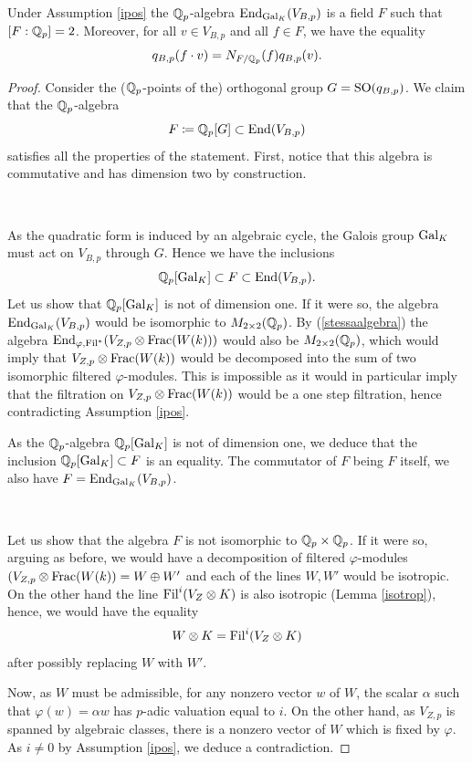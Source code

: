 \documentclass[11pt]{amsart}
\begin{document}
\begin{prop}\label{propendo}
Under  Assumption \ref{ipos} the
$\mathbb{Q}_p$-algebra  $\textnormal{End}_{\textnormal{Gal}_K}(V_{B,p})$
is a field $F$ such that  $[F:\mathbb{Q}_p]=2$. Moreover, for all $v\in V_{B,p}$ and all $f\in F$,  we have the equality
\begin{equation} \label{eq:nonso}
 q_{B,p}(f \cdot v)=N_{F/\mathbb{Q}_p}(f) q_{B,p}(v).
\end{equation}
\end{prop}
\begin{proof}
Consider the ($\mathbb{Q}_p$-points of the) orthogonal  group $G=\textnormal{SO}(q_{B,p})$. We claim that the $\mathbb{Q}_p$-algebra
\[F\coloneqq \mathbb{Q}_p[G]\subset \textnormal{End} (V_{B,p})\]
satisfies all the properties of the statement. First, notice that this algebra is commutative and has dimension two by construction.  

\

As the quadratic form is induced by an algebraic cycle, the Galois group $\textnormal{Gal}_K$ must act on $V_{B,p}$ through $G$. Hence we have the inclusions  
\[\mathbb{Q}_p[\textnormal{Gal}_K]\subset  F \subset  \textnormal{End} (V_{B,p}).\] 
Let us show that $\mathbb{Q}_p[\textnormal{Gal}_K]$ is not of dimension one. If it were so, the algebra $\textnormal{End}_{\textnormal{Gal}_K}(V_{B,p})$ would be isomorphic to $M_{2\times 2}(\mathbb{Q}_p)$. By   (\ref{stessaalgebra}) the algebra $\textnormal{End}_{\varphi,\textnormal{Fil}^*}(V_{Z,p}\otimes \mathrm{Frac}(W(k)))$ would also be $M_{2\times 2}(\mathbb{Q}_p)$, which would imply that $V_{Z,p}\otimes \mathrm{Frac}(W(k))$ would be decomposed into the sum of two isomorphic filtered $\varphi$-modules. This is impossible as it would in particular imply that the filtration on $V_{Z,p}\otimes \mathrm{Frac}(W(k))$ would be a one step filtration, hence contradicting Assumption  \ref{ipos}.

As the $\mathbb{Q}_p$-algebra $\mathbb{Q}_p[\textnormal{Gal}_K]$ is not of dimension one, we deduce that the  inclusion $\mathbb{Q}_p[\textnormal{Gal}_K]\subset  F$ is an equality. The commutator of $F$ being $F$ itself, we also have
$F=\textnormal{End}_{\textnormal{Gal}_K}(V_{B,p})$. 

\

Let us show that the algebra $F$ is not isomorphic to $\mathbb{Q}_p \times \mathbb{Q}_p$. If it were so, arguing as before, we would have a decomposition of 
filtered $\varphi$-modules
$(V_{Z,p}\otimes \mathrm{Frac}(W(k))= W \oplus W'$ and each of the lines $W, W'$ would be isotropic. On the other hand  the line $\textnormal{Fil}^i(V_Z\otimes K)$ is also isotropic (Lemma \ref{isotrop}), hence, we would have  the equality 
\[W\otimes K =\textnormal{Fil}^i(V_Z\otimes K)\]
after possibly replacing $W$ with $W'$.

Now, as $W$ must be admissible, for any nonzero vector $w$ of $W$, the scalar $\alpha$ such that $\varphi(w)=\alpha w$ has $p$-adic valuation equal to $i$.
On the other hand, as  $V_{Z,p}$ is spanned by algebraic classes,  there is a nonzero vector of $W$ which is fixed by $\varphi$. As $i\neq 0$ by Assumption  \ref{ipos}, we deduce a contradiction.


\end{proof}
\end{document}
